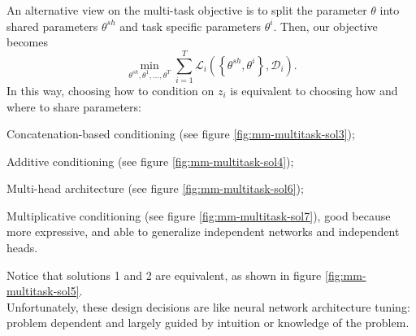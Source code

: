 An alternative view on the multi-task objective is to split the parameter $\theta$ into shared parameters $\theta^{sh}$ and task specific parameters $\theta^i$. Then, our objective becomes
\begin{equation}\label{eq:multi-task-objective-2}
    \min_{\theta^{sh}, \theta^1, \ldots, \theta^T} \sum_{i=1}^{T} \mathcal{L}_i \left(\left\{ \theta^{sh}, \theta^i \right\}, \mathcal{D}_i \right).
\end{equation}
In this way, choosing how to condition on $z_i$ is equivalent to choosing how and where to share parameters:
\begin{myenum}
    \item Concatenation-based conditioning (see figure \ref{fig:mm-multitask-sol3});
    \item Additive conditioning (see figure \ref{fig:mm-multitask-sol4});
    \item Multi-head architecture (see figure \ref{fig:mm-multitask-sol6});
    \item Multiplicative conditioning (see figure \ref{fig:mm-multitask-sol7}), good because more expressive, and able to generalize independent networks and independent heads.
\end{myenum}
Notice that solutions 1 and 2 are equivalent, as shown in figure \ref{fig:mm-multitask-sol5}.\\
Unfortunately, these design decisions are like neural network architecture tuning: problem dependent and largely guided by intuition or knowledge of the problem.

